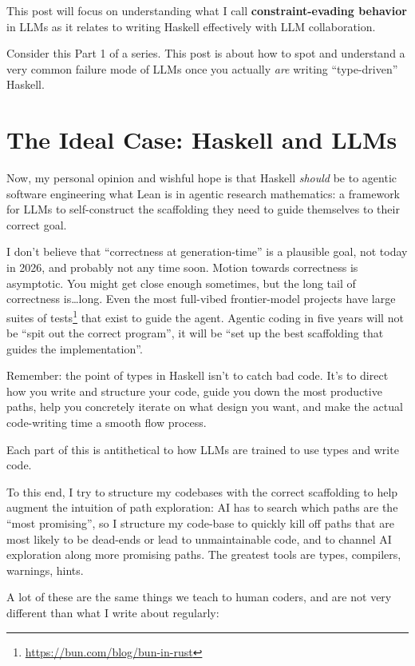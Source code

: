 \documentclass[]{article}
\renewcommand{\href}[2]{#2\footnote{\url{#1}}}
\begin{document}
This post will focus on understanding what I call \textbf{constraint-evading
behavior} in LLMs as it relates to writing Haskell effectively with LLM
collaboration.

Consider this Part 1 of a series. This post is about how to spot and understand
a very common failure mode of LLMs once you actually \emph{are} writing
``type-driven'' Haskell.

\section{The Ideal Case: Haskell and
LLMs}\label{the-ideal-case-haskell-and-llms}

Now, my personal opinion and wishful hope is that Haskell \emph{should} be to
agentic software engineering what Lean is in agentic research mathematics: a
framework for LLMs to self-construct the scaffolding they need to guide
themselves to their correct goal.

I don't believe that ``correctness at generation-time'' is a plausible goal, not
today in 2026, and probably not any time soon. Motion towards correctness is
asymptotic. You might get close enough sometimes, but the long tail of
correctness is\ldots long. Even the most full-vibed frontier-model projects have
\href{https://bun.com/blog/bun-in-rust}{large suites of tests} that exist to
guide the agent. Agentic coding in five years will not be ``spit out the correct
program'', it will be ``set up the best scaffolding that guides the
implementation''.

Remember: the point of types in Haskell isn't to catch bad code. It's to direct
how you write and structure your code, guide you down the most productive paths,
help you concretely iterate on what design you want, and make the actual
code-writing time a smooth flow process.

Each part of this is antithetical to how LLMs are trained to use types and write
code.

To this end, I try to structure my codebases with the correct scaffolding to
help augment the intuition of path exploration: AI has to search which paths are
the ``most promising'', so I structure my code-base to quickly kill off paths
that are most likely to be dead-ends or lead to unmaintainable code, and to
channel AI exploration along more promising paths. The greatest tools are types,
compilers, warnings, hints.

A lot of these are the same things we teach to human coders, and are not very
different than what I write about regularly:
\end{document}
